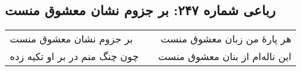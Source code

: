 \begin{center}
\section*{رباعی شماره ۲۴۷: بر جزوم نشان معشوق منست}
\label{sec:0247}
\begin{longtable}{l p{0.5cm} r}
بر جزوم نشان معشوق منست
&&
هر پارهٔ من زبان معشوق منست
\\
چون چنگ منم در بر او تکیه زده
&&
این ناله‌ام از بنان معشوق منست
\\
\end{longtable}
\end{center}
